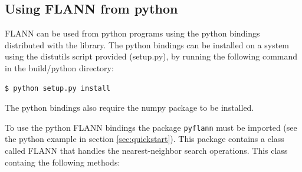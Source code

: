 \documentclass[letter,10pt]{article}
\begin{document}
\subsection{Using FLANN from python}

FLANN can be used from python programs using the python bindings distributed
with the library. The python bindings can be installed on a system using the
distutils script provided (setup.py), by running the following command in the
build/python directory:
\begin{Verbatim}[fontsize=\footnotesize,frame=single]
$ python setup.py install
\end{Verbatim}
The python bindings also require the numpy package to be installed.

To use the python FLANN bindings the package \texttt{pyflann} must be imported
(see the python example in section \ref{sec:quickstart}). This package contains
a class called FLANN that handles the nearest-neighbor search operations. This
class containg the following methods:
\end{document}
